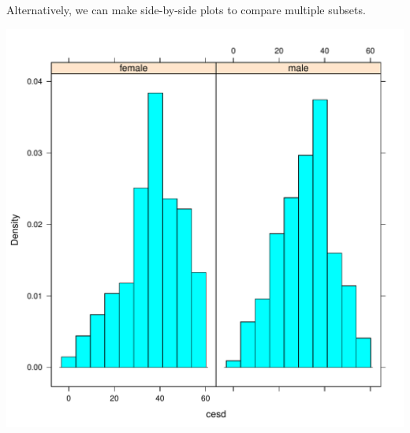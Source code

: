 Alternatively, we can make side-by-side plots to compare multiple subsets.
\begin{knitrout}
\color{fgcolor}\begin{kframe}
\begin{alltt}
\hlstd{(}\hlopt{~}  \hlopt{|}  
\end{alltt}
\end{kframe}
\includegraphics[width=\maxwidth]{figure/cesd-male-female-1} 

\end{knitrout}

